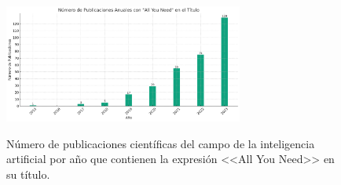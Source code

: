 \begin{figure}[H]
    \caption[Número de publicaciones científicas del campo de la inteligencia artificial por año que contienen la expresión <<All You Need>> en su título]{Número de publicaciones científicas del campo de la inteligencia artificial por año que contienen la expresión <<All You Need>> en su título.}
    \centering
    \includegraphics[width=0.7\textwidth]{./figuras/all_you_need_publicacionies_anuales.png}
    \label{fig:all_you_need_publicaciones}
\end{figure}



